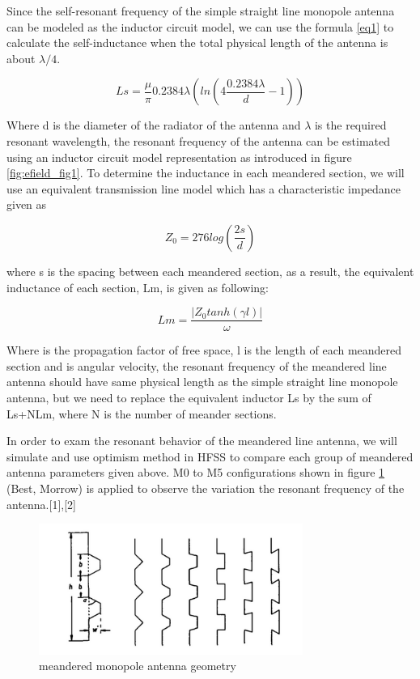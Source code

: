 Since the self-resonant frequency of the simple straight line monopole antenna can be modeled as the inductor circuit model, we can use the formula \eqref{eq1} to calculate the self-inductance when the total physical length of the antenna is about $\lambda/4$. 

\begin{equation}\label{eq1}Ls = \frac{\mu}{\pi}0.2384 \lambda (ln(4 \frac{0.2384 \lambda}{d} - 1)) \end{equation}

Where d is the diameter of the radiator of the antenna and $\lambda$ is the required resonant wavelength, the resonant frequency of the antenna can be estimated using an inductor circuit model representation as introduced in figure \ref{fig:efield_fig1}. To determine the inductance in each meandered section, we will use an equivalent transmission line model which has a characteristic impedance given as 

\begin{equation}Z_0 = 276log(\frac{2s}{d})\end{equation}

 where s is the spacing between each meandered section, as a result, the equivalent inductance of each section, Lm, is given as following:

\begin{equation}\label{eq2}Lm = \frac{|Z_0 tanh(\gamma l)|}{\omega} \end{equation}

Where  is the propagation factor of free space, l is the length of each meandered section and is angular velocity, the resonant frequency of the meandered line antenna should have same physical length as the simple straight line monopole antenna, but we need to replace the equivalent inductor Ls by the sum of Ls+NLm, where N is the number of meander sections.

In order to exam the resonant behavior of the meandered line antenna, we will simulate and use optimism method in HFSS to compare each group of meandered antenna parameters given above. M0 to M5 configurations shown in figure \ref{fig:efield_fig2} (Best, Morrow) is applied to observe the variation the resonant frequency of the antenna.[1],[2]

\begin{figure}[h]
	\begin{center}
		\includegraphics[width=3.4in]{./images/efield_image2.png}
		\caption{meandered monopole antenna geometry}
		\label{fig:efield_fig2}
	\end{center}
\end{figure}


